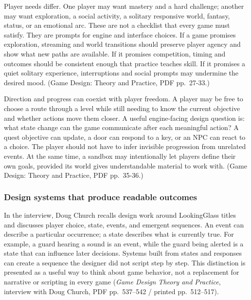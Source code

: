 Player needs differ. One player may want mastery and a hard challenge; another may want exploration, a social activity, a solitary responsive world, fantasy, status, or an emotional arc. These are not a checklist that every game must satisfy. They are prompts for engine and interface choices. If a game promises exploration, streaming and world transitions should preserve player agency and show what new paths are available. If it promises competition, timing and outcomes should be consistent enough that practice teaches skill. If it promises a quiet solitary experience, interruptions and social prompts may undermine the desired mood. (Game Design: Theory and Practice, PDF pp.~27-33.)

Direction and progress can coexist with player freedom. A player may be free to choose a route through a level while still needing to know the current objective and whether actions move them closer. A useful engine-facing design question is: what state change can the game communicate after each meaningful action? A quest objective can update, a door can respond to a key, or an NPC can react to a choice. The player should not have to infer invisible progression from unrelated events. At the same time, a sandbox may intentionally let players define their own goals, provided its world gives understandable material to work with. (Game Design: Theory and Practice, PDF pp.~35-36.)

\subsubsection{Design systems that produce readable outcomes}\label{05-engine-i-ch009-design-systems-that-produce-readable-outcomes}

\hypertarget{05-engine-i-ch009-design-systems-that-produce-readable-outcomes}{}

In the interview, Doug Church recalls design work around LookingGlass titles and discusses player choice, state, events, and emergent sequences. An event can describe a particular occurrence; a state describes what is currently true. For example, a guard hearing a sound is an event, while the guard being alerted is a state that can influence later decisions. Systems built from states and responses can create a sequence the designer did not script step by step. This distinction is presented as a useful way to think about game behavior, not a replacement for narrative or scripting in every game (\emph{Game Design Theory and Practice}, interview with Doug Church, PDF pp.~537--542 / printed pp.~512--517).


